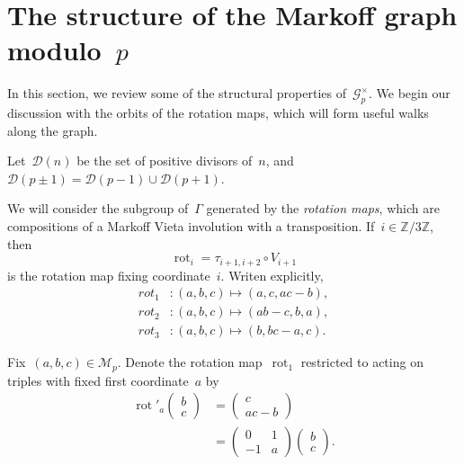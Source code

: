 \documentclass{article}
\DeclareMathOperator{\rot}{rot}
\theoremstyle{definition}
\theoremstyle{remark}
\begin{document}
\section{The structure of the Markoff graph modulo~$p$}

In this section, we review some of the structural properties of~$\mathcal{G}_p^\times$.
We begin our discussion with the orbits of the rotation maps, which will form useful walks along the graph.

Let~$\mathcal{D}(n)$ be the set of positive divisors of~$n$, and~$\mathcal{D}(p \pm 1) = \mathcal{D}(p - 1) \cup \mathcal{D}(p + 1)$.

We will consider the subgroup of~$\Gamma$ generated by the \textit{rotation maps}, which are compositions of a Markoff Vieta involution with a transposition.
If~$i \in \mathbb{Z}/3\mathbb{Z}$, then
\[ \rot_{i} = \tau_{i + 1, i + 2} \circ V_{i + 1} \]
is the rotation map fixing coordinate~$i$.
Writen explicitly,
\begin{align*}
    rot_1 &\colon (a, b, c) \mapsto (a, c, ac - b), \\
    rot_2 &\colon (a, b, c) \mapsto (ab - c, b, a), \\
    rot_3 &\colon (a, b, c) \mapsto (b, bc - a, c).
\end{align*}

Fix~$(a, b, c) \in \mathcal{M}_p$.
Denote the rotation map~$\rot_1$ restricted to acting on triples with fixed first coordinate~$a$ by
\begin{align*}
        \rot'_a \begin{pmatrix*} b \\ c \end{pmatrix*} &= \begin{pmatrix*} c \\ ac - b \end{pmatrix*} \\
                                                          &= \begin{pmatrix*} 0 & 1 \\ -1 & a \end{pmatrix*} \begin{pmatrix*} b \\ c \end{pmatrix*}.
\end{align*}
\end{document}
